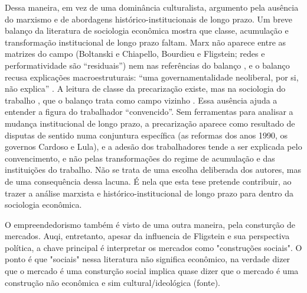 Dessa maneira, em vez de uma dominância culturalista, argumento pela ausência do marxismo e de abordagens histórico-institucionais de longo prazo. Um breve balanço da literatura de sociologia econômica mostra que classe, acumulação e transformação institucional de longo prazo faltam. Marx não aparece entre as matrizes do campo (Boltanski e Chiapello, Bourdieu e Fligstein; redes e performatividade são ``residuais'') \citep[p.~34-37]{veretanahoum_sociologia_2017} nem nas referências do balanço \citep[p.~76-86]{veretanahoum_sociologia_2017}, e o balanço recusa explicações macroestruturais: ``uma governamentalidade neoliberal, por si, não explica'' \citep[p.~73]{veretanahoum_sociologia_2017}. A leitura de classe da precarização existe, mas na sociologia do trabalho \citep{filgueiras_plataformas_2020, braga_politica_2012, druck_trabalho_2011, marcelino_o_2020}, que o balanço trata como campo vizinho \citep[p.~24-25, 57-58]{veretanahoum_sociologia_2017}. Essa ausência ajuda a entender a figura do trabalhador ``convencido''. Sem ferramentas para analisar a mudança institucional de longo prazo, a precarização aparece como resultado de disputas de sentido numa conjuntura específica (as reformas dos anos 1990, os governos Cardoso e Lula), e a adesão dos trabalhadores tende a ser explicada pelo convencimento, e não pelas transformações do regime de acumulação e das instituições do trabalho. Não se trata de uma escolha deliberada dos autores, mas de uma consequência dessa lacuna. É nela que esta tese pretende contribuir, ao trazer a análise marxista e histórico-institucional de longo prazo para dentro da sociologia econômica.

O empreendedorismo também é visto de uma outra maneira, pela consturção de mercados. Auqi, entretanto, apesar da influencia de Fligstein e sua perspectiva política, a chave principal é interpretar os mercados como "construções sociais". O ponto é que "sociais" nessa literatura não significa econômico, na verdade dizer que o mercado é uma consturção social implica quase dizer que o mercado é uma construção não econômica e sim cultural/ideológica (fonte).


